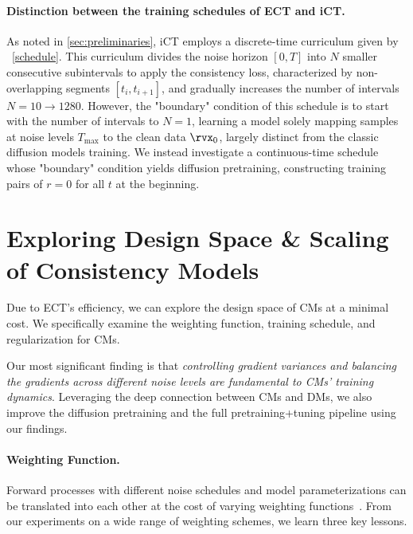 \paragraph{Distinction between the training schedules of ECT and iCT.} 
As noted in \cref{sec:preliminaries}, iCT \citep{ict} employs a discrete-time curriculum given by ~\cref{schedule}. 
This curriculum divides the noise horizon $[0,T]$ into $N$ smaller consecutive subintervals to apply the consistency loss, characterized by non-overlapping segments $[t_i, t_{i+1}]$, and gradually increases the number of intervals $N=10 \to 1280$. 
%
However, the "boundary" condition of this schedule is to start with the number of intervals to $N=1$, learning a model solely mapping samples at noise levels $T_{\text{max}}$ to the clean data $\x_0$, largely distinct from the classic diffusion models training.
%
We instead investigate a continuous-time schedule whose "boundary" condition yields diffusion pretraining, \ie constructing training pairs of $r=0$ for all $t$ at the beginning.


\section{Exploring Design Space \& Scaling of Consistency Models}
\label{sec:additional-experimental-results}

Due to ECT's efficiency, we can explore the design space of CMs at a minimal cost. We specifically examine the weighting function, training schedule, and regularization for CMs.

Our most significant finding is that \textit{controlling gradient variances and balancing the gradients across different noise levels are fundamental to CMs' training dynamics}. Leveraging the deep connection between CMs and DMs, we also improve the diffusion pretraining and the full pretraining+tuning pipeline using our findings.

\paragraph{Weighting Function.} Forward processes with different noise schedules and model parameterizations can be translated into each other at the cost of varying weighting functions~\citep{wt}.
From our experiments on a wide range of weighting schemes, we learn three key lessons.

